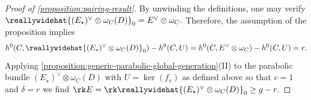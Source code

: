 \begin{proof}[Proof of \autoref{proposition:pairing-result}]
By unwinding the definitions, one may verify $\reallywidehat{(E_\star)^\vee \otimes
\omega_C(D)}_0=E^\vee \otimes \omega_C.$
Therefore, the assumption of the proposition implies
\begin{align*}
	h^0(C,\reallywidehat{(E_\star)^\vee \otimes
\omega_C(D)}_0) - h^0(C, U) =
h^0(C,E^\vee \otimes \omega_C) - h^0(C, U) =
r.
\end{align*}
Applying \autoref{proposition:generic-parabolic-global-generation}(II)
to the parabolic bundle
$(E_\star)^\vee \otimes
\omega_C(D)$
with $U = \ker(f_v)$ as defined above so that $c =
1$ and $\delta = r$ we find $\rk E=\rk \reallywidehat{(E_\star)^\vee \otimes
\omega_C(D)}_0 \geq g - r.$
\end{proof}
